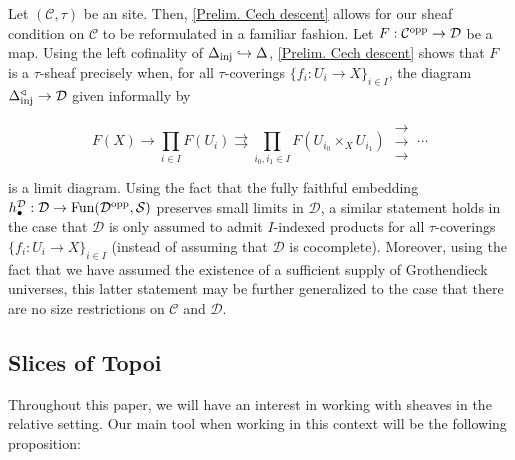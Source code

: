 \documentclass[10pt]{article}
\newcommand{\mS}{\mathcal S}
\newcommand{\C}{\mathcal C}
\newcommand{\cD}{\mathcal{D}}
\theoremstyle{witharg}
\theoremstyle{witharg}
\theoremstyle{witharg2}
\begin{document}
\begin{remark}{}\label{Diagram Sheaf condition for sites}

    Let $(\C,\tau)$ be an site. Then, \ref{Prelim. Cech descent} allows for our sheaf condition on $\C$ to be reformulated in a familiar fashion. Let $F:\C^{\textnormal{opp}}\rightarrow \cD$ be a map. Using the left cofinality of $\Delta_{\textnormal{inj}}\hookrightarrow \Delta$, \ref{Prelim. Cech descent} shows that $F$ is a $\tau$-sheaf precisely when, for all $\tau$-coverings $\{f_i:U_i\rightarrow X\}_{i\in I}$, the diagram $\Delta^\triangleleft_{\textnormal{inj}}\rightarrow \cD$ given informally by

    $$F(X)\rightarrow \prod_{i\in I}F(U_i)\rightrightarrows \prod_{i_0,i_1\in I}F(U_{i_0}\times_XU_{i_1})\ \substack{\rightarrow\\[-0.92em] \rightarrow \\[-0.92em] \rightarrow}\ \cdots$$

    \noindent is a limit diagram. Using the fact that the fully faithful embedding $h^\cD_\bullet:\cD\rightarrow \textnormal{Fun}(\cD^{\textnormal{opp}},\mS)$ preserves small limits in $\cD$, a similar statement holds in the case that $\cD$ is only assumed to admit $I$-indexed products for all $\tau$-coverings $\{f_i:U_i\rightarrow X\}_{i\in I}$ (instead of assuming that $\cD$ is cocomplete). Moreover, using the fact that we have assumed the existence of a sufficient supply of Grothendieck universes, this latter statement may be further generalized to the case that there are no size restrictions on $\C$ and $\cD$.

    
\end{remark}



\subsection{Slices of Topoi}\label{Slices of Sheaf Topoi}

Throughout this paper, we will have an interest in working with sheaves in the relative setting. Our main tool when working in this context will be the following proposition: 
\end{document}
